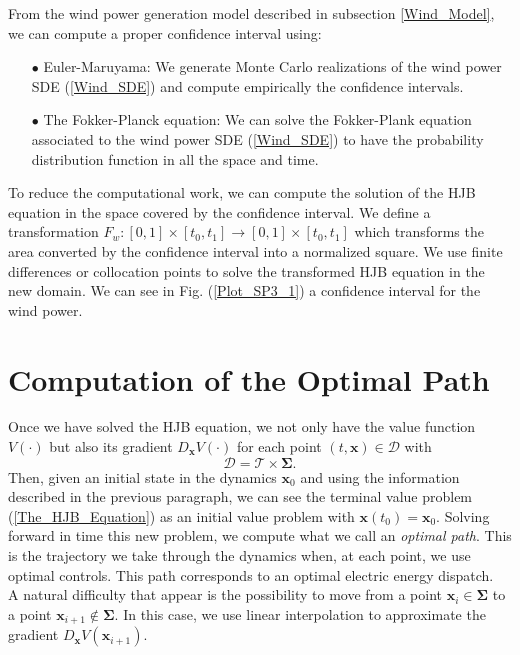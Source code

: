 From the wind power generation model described in subsection \ref{Wind_Model}, we can compute a proper confidence interval using:

\begin{enumerate}

\item[$\bullet$] Euler-Maruyama: We generate Monte Carlo realizations of the wind power SDE (\ref{Wind_SDE}) and compute empirically the confidence intervals.

\item[$\bullet$] The Fokker-Planck equation: We can solve the Fokker-Plank equation associated to the wind power SDE (\ref{Wind_SDE}) to have the probability distribution function in all the space and time.

\end{enumerate}
To reduce the computational work, we can compute the solution of the HJB equation in the space covered by the confidence interval. We define a transformation $F_w:[0,1]\times[t_0,t_1]\to[0,1]\times[t_0,t_1]$ which transforms the area converted by the confidence interval into a normalized square. We use finite differences or collocation points to solve the transformed HJB equation in the new domain. We can see in Fig. (\ref{Plot_SP3_1}) a confidence interval for the wind power.

\section{Computation of the Optimal Path} \label{Subsection_OP}

Once we have solved the HJB equation, we not only have the value function $V(\cdot)$ but also its gradient $D_{\bm{x}}V(\cdot)$ for each point $(t,\bm{x})\in\mathcal{D}$ with
\begin{equation}
\mathcal{D}=\mathcal{T}\times\bm{\Sigma}.
\end{equation}
Then, given an initial state in the dynamics $\bm{x}_0$ and using the information described in the previous paragraph, we can see the terminal value problem (\ref{The_HJB_Equation}) as an initial value problem with $\bm{x}(t_0)=\bm{x}_0$. Solving forward in time this new problem, we compute what we call an \textit{optimal path}. This is the trajectory we take through the dynamics when, at each point, we use optimal controls. This path corresponds to an optimal electric energy dispatch.\\
A natural difficulty that appear is the possibility to move from a point $\bm{x}_i\in\bm{\Sigma}$ to a point $\bm{x}_{i+1}\notin\bm{\Sigma}$. In this case, we use linear interpolation to approximate the gradient $D_{\bm{x}}V(\bm{x}_{i+1})$.

